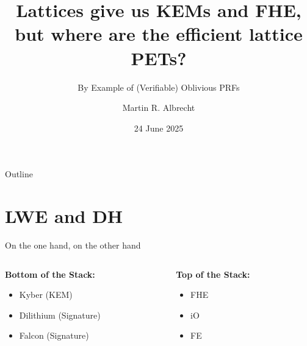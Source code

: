 \documentclass[xcolor=table,10pt,aspectratio=169]{beamer}
\author{Martin R. Albrecht}
\date{24 June 2025}
\title{Lattices give us KEMs and FHE, but where are the efficient lattice PETs?}
\subtitle{By Example of (Verifiable) Oblivious PRFs}
\begin{document}
\maketitle
\begin{frame}{Outline}
\tableofcontents
\end{frame}

\section{LWE and DH}
\label{sec:org04761e5}
\begin{frame}[label={sec:org98ccf7a}]{On the one hand, on the other hand}
\begin{columns}[t]
\begin{column}{0.5\columnwidth}
\textbf{Bottom of the Stack:}

\begin{itemize}
\item Kyber (KEM)
\item Dilithium (Signature)
\item Falcon (Signature)
\end{itemize}
\end{column}
\begin{column}{0.5\columnwidth}
\textbf{Top of the Stack:}

\begin{itemize}
\item FHE \cite{PhD:Gentry09,ITCS:BraGenVai12,JC:CGGI20,C:GenSahWat13}
\item iO \cite{FOCS:GGHRSW13,EC:BDGM20}
\item FE \cite{EC:SahWat05,TCC:BonSahWat11}
\end{itemize}
\end{column}
\end{columns}
\end{frame}
\end{document}
